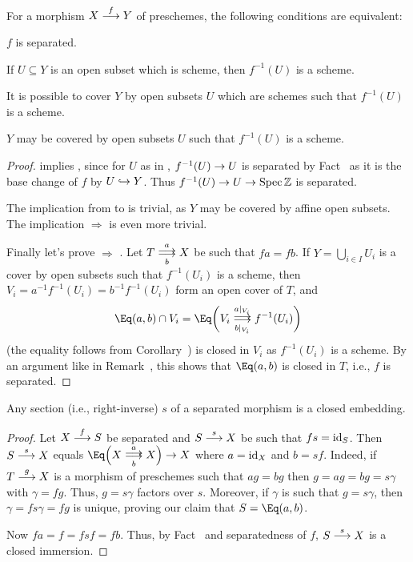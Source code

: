 \documentclass[a4paper,parskip=half,numbers=enddot, DIV=12]{scrreprt}
\begin{document}
\begin{fact}
    For a morphism $X\morphism[f] Y$ of preschemes, the following conditions are equivalent:
    \begin{alphanumerate}
    \item 
        $f$ is separated.
    \item 
        If $U\subseteq Y$ is an open subset which is scheme, then $f^{-1}(U)$ is a scheme.
    \item 
        It is possible to cover $Y$ by open subsets $U$ which are schemes such that $f^{-1}(U)$ is a scheme.
     \item
	     $Y$ may be covered by open subsets $U$ such that $f^{-1}(U)$ is a scheme.
    \end{alphanumerate}
\end{fact}
\begin{proof}
     implies , since for $U$ as in , $f^{-1}(U)\morphism U$ is separated by Fact~ as it is the base change of $f$ by $U\monomorphism Y$. Thus $f^{-1}(U)\morphism U\morphism \Spec\IZ$ is separated.
    
    The implication from  to  is trivial, as $Y$ may be covered by affine open subsets. The implication  $\Rightarrow$  is even more trivial.
    
    Finally let's prove  $\Rightarrow$ . Let $T\doublemorphism[a][b] X$ be such that $fa = fb$. If $Y=\bigcup_{i\in I} U_i$ is a cover by open subsets such that $f^{-1}(U_i)$ is a scheme, then $V_i = a^{-1}f^{-1}(U_i) = b^{-1}f^{-1} (U_i)$ form an open cover of $T$, and 
    \begin{align*}
    	\Eq(a,b) \cap V_i = \Eq\bigg(V_i\doublemorphism[a|_{V_i}][b|_{V_i}]f^{-1}(U_i) \bigg)
    \end{align*}
    (the equality follows from Corollary~) is closed in $V_i$ as $f^{-1}(U_i) $ is a scheme. By an argument like in Remark~, this shows that $\Eq(a,b)$ is closed in $T$, i.e., $f$ is separated.
\end{proof}
\begin{prop}
    Any section (i.e., right-inverse) $s$ of a separated morphism is a closed embedding. 
\end{prop}
\begin{proof}
    Let $X\morphism[f] S$ be separated and $S\morphism[s] X$ be such that $fs = \operatorname{id}_S$. Then $S\morphism[s] X$ equals $\Eq\Big(X\doublemorphism[a][b] X\Big)\morphism X$ where $a=\operatorname{id}_X$ and $b= sf$. Indeed, if $T\morphism[g] X$ is a morphism of preschemes such that $ag = bg$ then $g = ag = bg = s\gamma$ with $\gamma = fg$. Thus, $g = s\gamma$ factors over $s$. Moreover, if $\gamma$ is such that $g= s\gamma$, then $\gamma = fs\gamma = fg$ is unique, proving our claim that $S=\Eq(a,b)$.
    
     Now $fa = f = fsf = fb$. Thus, by Fact~ and separatedness of $f$, $S\morphism[s] X$ is a closed immersion.
\end{proof}
\end{document}
